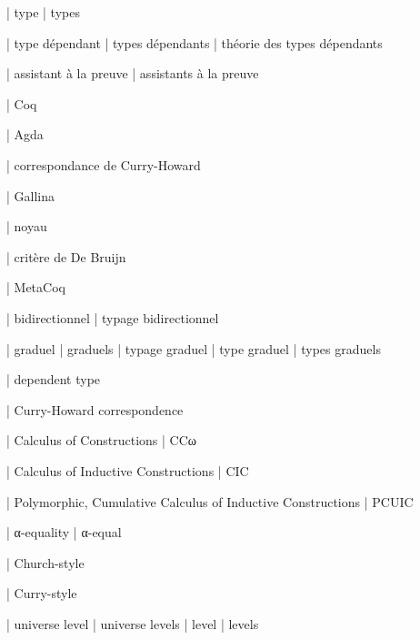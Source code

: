 






  | type
  | types

  | type dépendant
  | types dépendants
  | théorie des types dépendants

  | assistant à la preuve
  | assistants à la preuve

  | Coq

  | Agda

  | correspondance de Curry-Howard

  | Gallina

  | noyau

  | critère de De Bruijn

  | MetaCoq

  | bidirectionnel
  | typage bidirectionnel

  | graduel
  | graduels
  | typage graduel
  | type graduel
  | types graduels


  | dependent type

  | Curry-Howard correspondence


  | Calculus of Constructions
  | CCω

  | Calculus of Inductive Constructions
  | CIC

  | Polymorphic, Cumulative Calculus of Inductive Constructions
  | PCUIC

  | α-equality
  | α-equal 

  | Church-style

  | Curry-style

  | universe level
  | universe levels
  | level
  | levels

